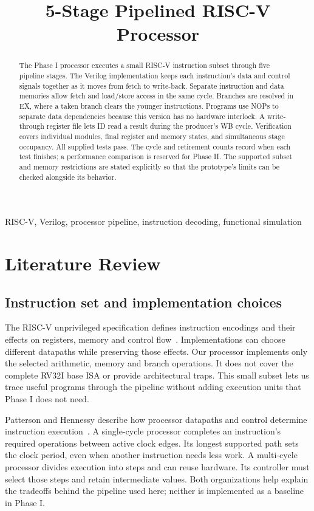 \documentclass[conference]{IEEEtran}
\title{5-Stage Pipelined RISC-V Processor}
\author{\IEEEauthorblockN{Aryan Kinha, Preetish Ubhrani, Divyanshu Singh,\\Jatin Kumar Singh, Jatin Verma}
\IEEEauthorblockA{Newton School of Technology, Rishihood University}}
\begin{document}
\raggedbottom
\maketitle
\begin{abstract}
The Phase I processor executes a small RISC-V instruction subset through five pipeline stages. The Verilog implementation keeps each instruction's data and control signals together as it moves from fetch to write-back. Separate instruction and data memories allow fetch and load/store access in the same cycle. Branches are resolved in EX, where a taken branch clears the younger instructions. Programs use NOPs to separate data dependencies because this version has no hardware interlock. A write-through register file lets ID read a result during the producer's WB cycle. Verification covers individual modules, final register and memory states, and simultaneous stage occupancy. All supplied tests pass. The cycle and retirement counts record when each test finishes; a performance comparison is reserved for Phase II. The supported subset and memory restrictions are stated explicitly so that the prototype's limits can be checked alongside its behavior.
\end{abstract}
\begin{IEEEkeywords}
RISC-V, Verilog, processor pipeline, instruction decoding, functional simulation
\end{IEEEkeywords}

\section{Literature Review}
\subsection{Instruction set and implementation choices}
The RISC-V unprivileged specification defines instruction encodings and their effects on registers, memory and control flow~\cite{isa}. Implementations can choose different datapaths while preserving those effects. Our processor implements only the selected arithmetic, memory and branch operations. It does not cover the complete RV32I base ISA or provide architectural traps. This small subset lets us trace useful programs through the pipeline without adding execution units that Phase I does not need.

Patterson and Hennessy describe how processor datapaths and control determine instruction execution~\cite{patterson}. A single-cycle processor completes an instruction's required operations between active clock edges. Its longest supported path sets the clock period, even when another instruction needs less work. A multi-cycle processor divides execution into steps and can reuse hardware. Its controller must select those steps and retain intermediate values. Both organizations help explain the tradeoffs behind the pipeline used here; neither is implemented as a baseline in Phase I.
\end{document}
